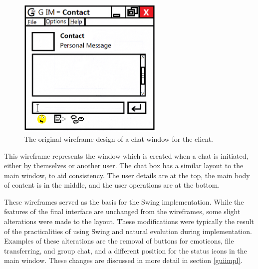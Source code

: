 \begin{figure}
    \begin{center}
        \includegraphics[width=7cm]{Design/diagrams/Chat_Box.png}
        \caption{The original wireframe design of a chat window for the client.}
        \label{chatBox}
    \end{center}
\end{figure}

This wireframe represents the window which is created when a chat is initiated, either by themselves or another user. The chat box has a similar layout to the main window, to aid consistency. The user details are at the top, the main body of content is in the middle, and the user operations are at the bottom.

These wireframes served as the basis for the Swing implementation. While the features of the final interface are unchanged from the wireframes, some slight alterations were made to the layout. These modifications were typically the result of the practicalities of using Swing and natural evolution during implementation. Examples of these alterations are the removal of buttons for emoticons, file transferring, and group chat, and a different position for the status icons in the main window. These changes are discussed in more detail in section \ref{guiimpl}.
